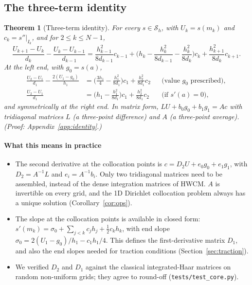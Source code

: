 \documentclass[preprint,12pt]{elsarticle}
\newtheorem{theorem}{Theorem}
\theoremstyle{remark}
\newcommand{\proofin}[1]{\hfill{\small\emph{(Proof: Appendix~\ref{#1}.)}}}
\begin{document}
\subsection{The three-term identity}
\begin{theorem}[Three-term identity]\label{thm:identity}
For every $s\in\mathcal S_h$, with $U_k=s(m_k)$ and $c_k=s''|_{I_k}$, and for $2\le k\le N-1$,
\begin{equation}\label{eq:interior}
\frac{U_{k+1}-U_k}{d_k}-\frac{U_k-U_{k-1}}{d_{k-1}}
=\frac{h_{k-1}^2}{8d_{k-1}}c_{k-1}+\Big(h_k-\frac{h_k^2}{8d_{k-1}}-\frac{h_k^2}{8d_k}\Big)c_k+\frac{h_{k+1}^2}{8d_k}c_{k+1}.
\end{equation}
At the left end, with $g_0=s(a)$,
\begin{align}
\frac{U_2-U_1}{d_1}-\frac{2(U_1-g_0)}{h_1}&=\Big(\frac{3h_1}{4}-\frac{h_1^2}{8d_1}\Big)c_1+\frac{h_2^2}{8d_1}c_2 &&\text{(value $g_0$ prescribed)},\label{eq:dirrow}\\
\frac{U_2-U_1}{d_1}&=\Big(h_1-\frac{h_1^2}{8d_1}\Big)c_1+\frac{h_2^2}{8d_1}c_2 &&\text{(if } s'(a)=0),\label{eq:neurow}
\end{align}
and symmetrically at the right end. In matrix form, $LU+b_0g_0+b_1g_1=Ac$ with tridiagonal matrices
$L$ (a three-point difference) and $A$ (a three-point average).
\proofin{app:identity}
\end{theorem}

\paragraph{What this means in practice}
\begin{itemize}
\item The second derivative at the collocation points is $c=D_2U+e_0g_0+e_1g_1$, with
$D_2=A^{-1}L$ and $e_i=A^{-1}b_i$. Only two tridiagonal matrices need to be assembled, instead of the
dense integration matrices of HWCM. $A$ is invertible on every grid, and the 1D Dirichlet collocation
problem always has a unique solution (Corollary~\ref{cor:ops}).
\item The slope at the collocation points is available in closed form:
$s'(m_k)=\sigma_0+\sum_{j<k}c_jh_j+\tfrac12c_kh_k$, with end slope
$\sigma_0=2(U_1-g_0)/h_1-c_1h_1/4$. This defines the first-derivative matrix $D_1$, and also the
end slopes needed for traction conditions (Section~\ref{sec:traction}).
\item We verified $D_2$ and $D_1$ against the classical integrated-Haar matrices on random
non-uniform grids; they agree to round-off (\texttt{tests/test\_core.py}).
\end{itemize}
\end{document}
